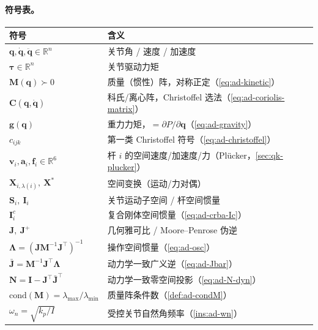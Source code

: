 \paragraph{符号表。}
\begin{center}
\begin{tabular}{ll}
\toprule
符号 & 含义 \\
\midrule
$\mathbf{q},\dot{\mathbf{q}},\ddot{\mathbf{q}}\in\mathbb{R}^n$ & 关节角 / 速度 / 加速度 \\
$\boldsymbol{\tau}\in\mathbb{R}^n$ & 关节驱动力矩 \\
$\mathbf{M}(\mathbf{q})\succ0$ & 质量（惯性）阵，对称正定（\cref{eq:ad-kinetic}）\\
$\mathbf{C}(\mathbf{q},\dot{\mathbf{q}})$ & 科氏/离心阵，Christoffel 选法（\cref{eq:ad-coriolis-matrix}）\\
$\mathbf{g}(\mathbf{q})$ & 重力力矩，$=\partial P/\partial\mathbf{q}$（\cref{eq:ad-gravity}）\\
$c_{ijk}$ & 第一类 Christoffel 符号（\cref{eq:ad-christoffel}）\\
$\mathbf{v}_i,\mathbf{a}_i,\mathbf{f}_i\in\mathbb{R}^6$ & 杆 $i$ 的空间速度/加速度/力（Plücker，\cref{sec:qk-plucker}）\\
$\mathbf{X}_{i,\lambda(i)},\ \mathbf{X}^*$ & 空间变换（运动/力对偶）\\
$\mathbf{S}_i,\ \mathbf{I}_i$ & 关节运动子空间 / 杆空间惯量 \\
$\mathbf{I}^c_i$ & 复合刚体空间惯量（\cref{eq:ad-crba-Ic}）\\
$\mathbf{J},\ \mathbf{J}^+$ & 几何雅可比 / Moore--Penrose 伪逆 \\
$\boldsymbol{\Lambda}=(\mathbf{J}\mathbf{M}^{-1}\mathbf{J}^\top)^{-1}$ & 操作空间惯量（\cref{eq:ad-osc}）\\
$\bar{\mathbf{J}}=\mathbf{M}^{-1}\mathbf{J}^\top\boldsymbol{\Lambda}$ & 动力学一致广义逆（\cref{eq:ad-Jbar}）\\
$\mathbf{N}=\mathbf{I}-\mathbf{J}^\top\bar{\mathbf{J}}^\top$ & 动力学一致零空间投影（\cref{eq:ad-N-dyn}）\\
$\mathrm{cond}(\mathbf{M})=\lambda_{\max}/\lambda_{\min}$ & 质量阵条件数（\cref{def:ad-condM}）\\
$\omega_n=\sqrt{k_p/I}$ & 受控关节自然角频率（\cref{ins:ad-wn}）\\
\bottomrule
\end{tabular}
\end{center}

